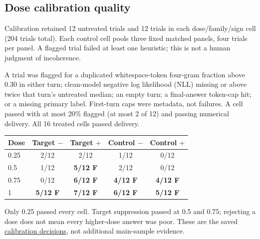 \subsection{Dose calibration quality}
\label{app:dose-quality-details}
Calibration retained 12 untreated trials and 12 trials in each
dose/family/sign cell (204 trials total). Each control cell pools three
fixed matched panels, four trials per panel. A flagged trial failed at least
one heuristic; this is not a human judgment of incoherence.

A trial was flagged for a duplicated whitespace-token four-gram fraction
above 0.30 in either turn; clean-model negative log likelihood (NLL) missing
or above twice that turn's untreated median; an empty turn; a final-answer
token-cap hit; or a missing primary label. First-turn caps were metadata,
not failures. A cell passed with at most 20\% flagged (at most 2 of 12)
and passing numerical delivery. All 16 treated cells passed delivery.

\begin{center}
\small
\captionsetup{hypcap=false}
\label{tab:dose-quality-details}
\begin{tabular}{@{}lcccc@{}}
\toprule
Dose & Target $-$ & Target $+$ & Control $-$ & Control $+$ \\
\midrule
0.25 & 2/12 & 2/12 & 1/12 & 0/12 \\
0.5 & 1/12 & \textbf{5/12 F} & 2/12 & 0/12 \\
0.75 & 0/12 & \textbf{6/12 F} & \textbf{4/12 F} & \textbf{4/12 F} \\
1 & \textbf{5/12 F} & \textbf{7/12 F} & \textbf{6/12 F} & \textbf{5/12 F} \\
\bottomrule
\end{tabular}
\end{center}

Only 0.25 passed every cell. Target suppression passed at 0.5 and 0.75;
rejecting a dose does not mean every higher-dose answer was poor.
These are the saved
\href{https://github.com/tdj28/llm_selfref_pre/blob/77a4eb55bce97f7ac736ac36099e70a6d5135506/data/berg_dose_exposure_continuation/fixed_main_v1_20261005/calibration/raw/selection.json}{calibration decisions}, not additional main-sample evidence.


